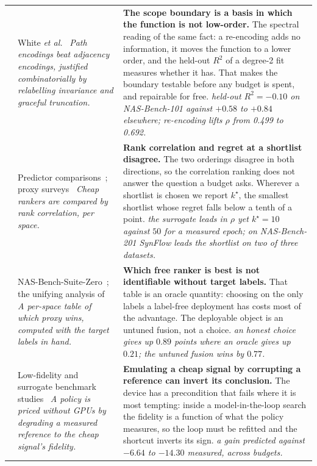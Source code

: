 \begin{table}[!t]
\begin{tabular}{@{}p{}p{}p{}@{}}
\addlinespace[2pt]
6 & White \emph{et al.}~\cite{white2020encodings} \emph{Path encodings beat adjacency encodings, justified combinatorially by relabelling invariance and graceful truncation.} & \textbf{The scope boundary is a basis in which the function is not low-order.} The spectral reading of the same fact: a re-encoding adds no information, it moves the function to a lower order, and the held-out $R^{2}$ of a degree-2 fit measures whether it has. That makes the boundary testable before any budget is spent, and repairable for free. \emph{held-out $R^{2}=-0.10$ on NAS-Bench-101 against $+0.58$ to $+0.84$ elsewhere; re-encoding lifts $\rho$ from 0.499 to 0.692.} \\
\addlinespace[2pt]
7 & Predictor comparisons~\cite{white2021powerful,ning2021evaluating}; proxy surveys~\cite{abdelfattah2021zerocost,shu2022unifying} \emph{Cheap rankers are compared by rank correlation, per space.} & \textbf{Rank correlation and regret at a shortlist disagree.} The two orderings disagree in both directions, so the correlation ranking does not answer the question a budget asks. Wherever a shortlist is chosen we report $k^{\star}$, the smallest shortlist whose regret falls below a tenth of a point. \emph{the surrogate leads in $\rho$ yet $k^{\star}=10$ against $50$ for a measured epoch; on NAS-Bench-201 SynFlow leads the shortlist on two of three datasets.} \\
\addlinespace[2pt]
8 & NAS-Bench-Suite-Zero~\cite{krishnakumar2022nasbenchsuitezero}; the unifying analysis of~\cite{shu2022unifying} \emph{A per-space table of which proxy wins, computed with the target labels in hand.} & \textbf{Which free ranker is best is not identifiable without target labels.} That table is an oracle quantity: choosing on the only labels a label-free deployment has costs most of the advantage. The deployable object is an untuned fusion, not a choice. \emph{an honest choice gives up $0.89$ points where an oracle gives up $0.21$; the untuned fusion wins by $0.77$.} \\
\addlinespace[2pt]
9 & Low-fidelity and surrogate benchmark studies~\cite{zela2022surrogate,mehta2022nasbenchsuite} \emph{A policy is priced without GPUs by degrading a measured reference to the cheap signal's fidelity.} & \textbf{Emulating a cheap signal by corrupting a reference can invert its conclusion.} The device has a precondition that fails where it is most tempting: inside a model-in-the-loop search the fidelity is a function of what the policy measures, so the loop must be refitted and the shortcut inverts its sign. \emph{a gain predicted against $-6.64$ to $-14.30$ measured, across budgets.} \\
\bottomrule
\end{tabular}
\end{table}
